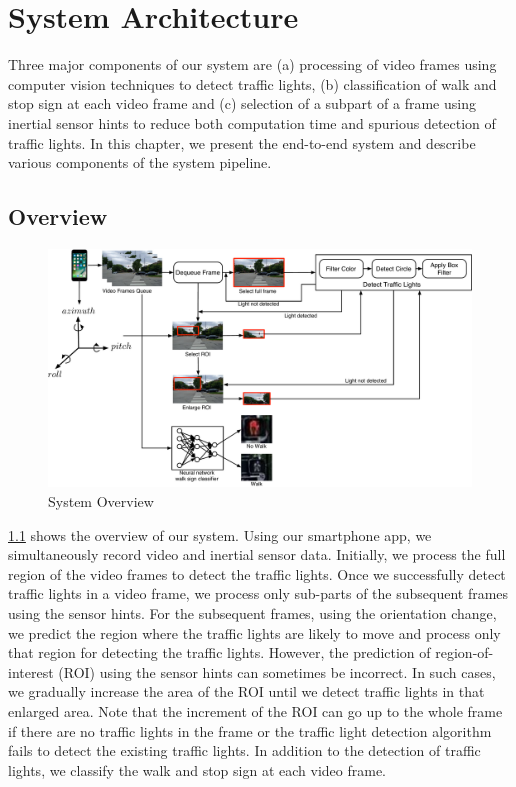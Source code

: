 \chapter{System Architecture}
\label{c:system}
Three major components of our system are (a) processing of video frames using computer vision techniques to detect traffic lights, (b) classification of walk and stop sign at each video frame and (c) selection of a subpart of a frame using inertial sensor hints to reduce both computation time and spurious detection of traffic lights. 
In this chapter, we present the end-to-end system and describe various components of the system pipeline.


\section{Overview}
\label{s:overview}

\begin{figure}
\centering
\includegraphics[width=6.2in]{figures/sysdia3.pdf}
\caption{System Overview}
\label{f:sys_dia}
\end{figure}

\ref{f:sys_dia} shows the overview of our system.
Using our smartphone app, we simultaneously record video and inertial sensor data.
Initially, we process the full region of the video frames to detect the traffic lights.
Once we successfully detect traffic lights in a video frame, we process only sub-parts of the subsequent frames using the sensor hints. 
For the subsequent frames, using the orientation change, we predict the region where the traffic lights are likely to move and process only that region for detecting the traffic lights.
However, the prediction of region-of-interest (ROI) using the sensor hints can sometimes be incorrect.
In such cases, we gradually increase the area of the ROI until we detect traffic lights in that enlarged area. 
Note that the increment of the ROI can go up to the whole frame if there are no traffic lights in the frame or the traffic light detection algorithm fails to detect the existing traffic lights. 
In addition to the detection of traffic lights, we classify the walk and stop sign at each video frame.

